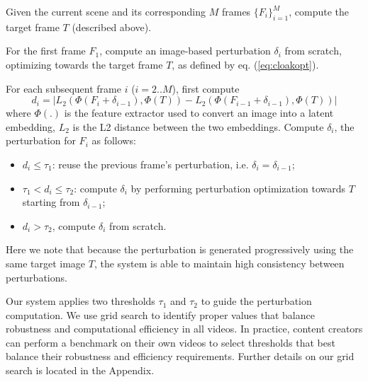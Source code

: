 \begin{packed_itemize}
  \item Given the current scene and its corresponding $M$ frames $\{F_i\}_{i=1}^{M}$, compute the target frame $T$ (described above).
  \item For the first frame $F_1$, compute an image-based perturbation
    $\delta_{i}$ from scratch, optimizing towards the target frame
    $T$, as defined by eq. (\ref{eq:cloakopt}). 
   \item For each subsequent frame $i$ ($i=2..M$), first compute
     \begin{equation}
       d_i=|L_2(\Phi(F_i+\delta_{i-1}), \Phi(T)) -
       L_2(\Phi(F_{i-1}+\delta_{i-1}),\Phi(T))| \label{eq:vg}
     \end{equation}
     where $\Phi(.)$ is 
     the feature extractor used to convert an image into a
     latent embedding, $L_2$ is the L2
     distance between the two embeddings. Compute  $\delta_{i}$, the perturbation for
     $F_i$  as follows:
     
     \begin{itemize}
     \item $d_i\leq\tau_1$: reuse the previous frame's perturbation,
       i.e. $\delta_{i}=\delta_{i-1}$;
     \item $\tau_1<d_i\leq\tau_2$: compute $\delta_{i}$ by
      performing perturbation optimization towards $T$ starting from
      $\delta_{i-1}$;
      \item $d_i > \tau_2$, compute $\delta_{i}$ from scratch.
    \end{itemize}

\end{packed_itemize}
Here we note that because the
  perturbation is generated progressively using the same target image
  $T$, the system is able to maintain 
  high consistency between perturbations.
  

\label{subsec:system-parameters}
Our system applies two thresholds $\tau_1$ and
$\tau_2$ to guide the perturbation computation.  We use grid search
to identify proper values that balance robustness and computational
efficiency in all videos. In practice, content creators can perform a benchmark on their own videos to select thresholds that best balance their robustness and efficiency requirements. Further details on our grid search is located in the Appendix.
